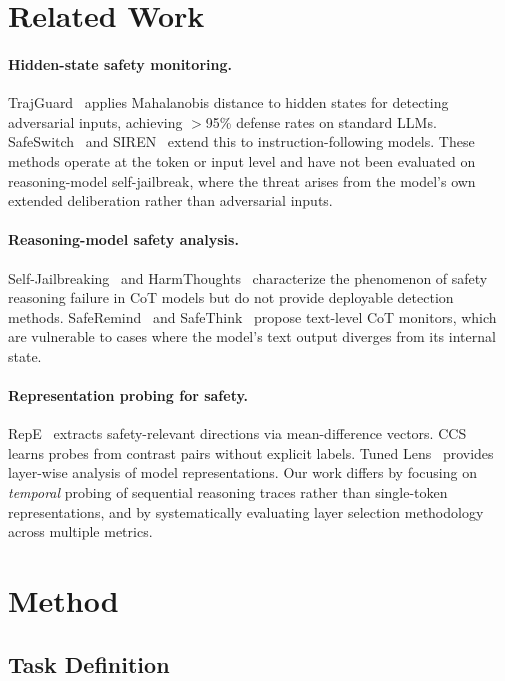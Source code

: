 \documentclass[11pt,a4paper]{article}
\begin{document}
\section{Related Work}

\paragraph{Hidden-state safety monitoring.}
TrajGuard~\cite{trajguard} applies Mahalanobis distance to hidden states for detecting adversarial inputs, achieving $>$95\% defense rates on standard LLMs.
SafeSwitch~\cite{safeswitch} and SIREN~\cite{siren} extend this to instruction-following models.
These methods operate at the token or input level and have not been evaluated on reasoning-model self-jailbreak, where the threat arises from the model's own extended deliberation rather than adversarial inputs.

\paragraph{Reasoning-model safety analysis.}
Self-Jailbreaking~\cite{self-jailbreak} and HarmThoughts~\cite{harmthoughts} characterize the phenomenon of safety reasoning failure in CoT models but do not provide deployable detection methods.
SafeRemind~\cite{saferemind} and SafeThink~\cite{safethink} propose text-level CoT monitors, which are vulnerable to cases where the model's text output diverges from its internal state.

\paragraph{Representation probing for safety.}
RepE~\cite{repe} extracts safety-relevant directions via mean-difference vectors.
CCS~\cite{burns2023} learns probes from contrast pairs without explicit labels.
Tuned Lens~\cite{tunedlens} provides layer-wise analysis of model representations.
Our work differs by focusing on \emph{temporal} probing of sequential reasoning traces rather than single-token representations, and by systematically evaluating layer selection methodology across multiple metrics.

\section{Method}

\subsection{Task Definition}
\label{sec:task}
\end{document}
